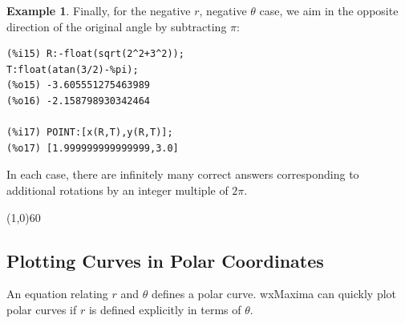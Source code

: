 \documentclass[10.5pt,twoside]{report}
\theoremstyle{definition}
\newtheorem{exmp}{Example}[section]
\begin{document}
\begin{exmp}
Finally, for the negative $r$, negative $\theta$ case, we aim in the opposite direction of the original angle by subtracting $\pi$:

\begin{verbatim}
(%i15) R:-float(sqrt(2^2+3^2));
T:float(atan(3/2)-%pi);
(%o15) -3.605551275463989
(%o16) -2.158798930342464

(%i17) POINT:[x(R,T),y(R,T)];
(%o17) [1.999999999999999,3.0]
\end{verbatim}

In each case, there are infinitely many correct answers corresponding to additional rotations by an integer multiple of $2\pi$.

\end{exmp}

\line(1,0){60}
\linethickness{0.5mm}
\pagebreak

\subsection{Plotting Curves in Polar Coordinates}

An equation relating $r$ and $\theta$ defines a polar curve.  wxMaxima can quickly plot polar curves if $r$ is defined explicitly in terms of $\theta$.\\
${}$\\
\end{document}
